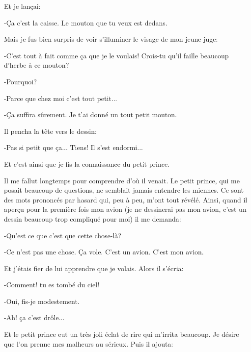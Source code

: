 \documentclass{report}
\begin{document}

Et je lançai:

-Ça c'est la caisse. Le mouton que tu veux est dedans.

Mais je fus bien surpris de voir s'illuminer le visage de mon jeune juge:

-C'est tout à fait comme ça que je le voulais! Crois-tu qu'il faille beaucoup d'herbe à ce mouton?

-Pourquoi?

-Parce que chez moi c'est tout petit...

-Ça suffira sûrement. Je t'ai donné un tout petit mouton.

Il pencha la tête vers le dessin:

-Pas si petit que ça... Tiens! Il s'est endormi...

Et c'est ainsi que je fis la connaissance du petit prince.

\parachapter[III]{} %
Il me fallut longtemps pour comprendre d'où il venait. Le petit prince, qui me posait beaucoup de questions, ne semblait jamais entendre les miennes. Ce sont des mots prononcés par hasard qui, peu à peu, m'ont tout révélé. Ainsi, quand il aperçu pour la première fois mon avion (je ne dessinerai pas mon avion, c'est un dessin beaucoup trop compliqué pour moi) il me demanda:

-Qu'est ce que c'est que cette chose-là?

-Ce n'est pas une chose. Ça vole. C'est un avion. C'est mon avion.

Et j'étais fier de lui apprendre que je volais. Alors il s'écria:

-Comment! tu es tombé du ciel!

-Oui, fis-je modestement.

-Ah! ça c'est drôle...

Et le petit prince eut un très joli éclat de rire qui m'irrita beaucoup. Je désire que l'on prenne mes malheurs au sérieux. Puis il ajouta:
\end{document}
